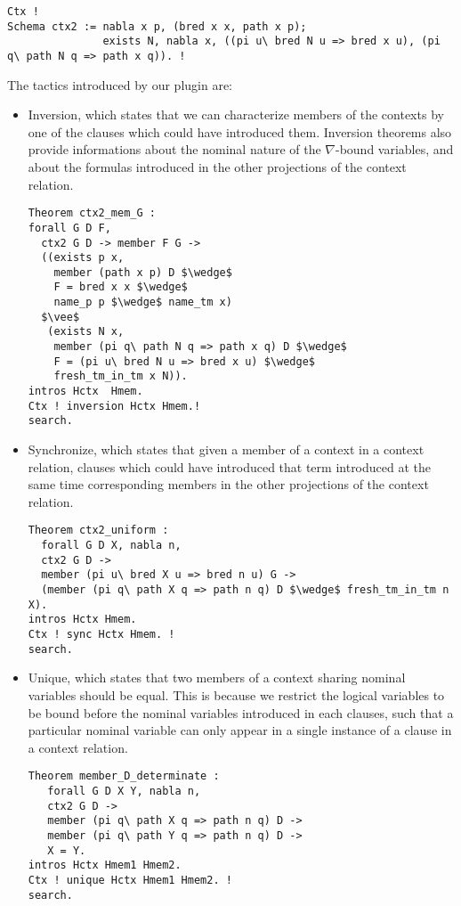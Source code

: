 \documentclass[nocopyrightspace,authoryear]{sigplanconf}
\begin{document}
\begin{lstlisting}
Ctx !
Schema ctx2 := nabla x p, (bred x x, path x p);
               exists N, nabla x, ((pi u\ bred N u => bred x u), (pi q\ path N q => path x q)). !
\end{lstlisting}


The tactics introduced by our plugin are:
\begin{itemize}
\item Inversion, which states that we can characterize members of the contexts by one of the clauses which could have introduced them. Inversion theorems also provide informations about the nominal nature of the $\nabla$-bound variables, and about the formulas introduced in the other projections of the context relation.

\begin{lstlisting}
Theorem ctx2_mem_G :
forall G D F,
  ctx2 G D -> member F G ->
  ((exists p x, 
    member (path x p) D $\wedge$
    F = bred x x $\wedge$  
    name_p p $\wedge$ name_tm x)
  $\vee$
   (exists N x, 
    member (pi q\ path N q => path x q) D $\wedge$ 
    F = (pi u\ bred N u => bred x u) $\wedge$  
    fresh_tm_in_tm x N)).
intros Hctx  Hmem. 
Ctx ! inversion Hctx Hmem.! 
search.
\end{lstlisting}

\item Synchronize, which states that given a member of a context in a context relation, clauses which could have introduced that term introduced at the same time corresponding members in the other projections of the context relation.
\begin{lstlisting}
Theorem ctx2_uniform :
  forall G D X, nabla n,
  ctx2 G D ->
  member (pi u\ bred X u => bred n u) G ->
  (member (pi q\ path X q => path n q) D $\wedge$ fresh_tm_in_tm n X).
intros Hctx Hmem. 
Ctx ! sync Hctx Hmem. ! 
search.
\end{lstlisting}

\item Unique, which states that two members of a context sharing nominal variables should be equal. This is because we restrict the logical variables to be bound before the nominal variables introduced in each clauses, such that a particular nominal variable can only appear in a single instance of a clause in a context relation.   

\begin{lstlisting}
Theorem member_D_determinate :
   forall G D X Y, nabla n,
   ctx2 G D ->
   member (pi q\ path X q => path n q) D ->
   member (pi q\ path Y q => path n q) D ->
   X = Y.
intros Hctx Hmem1 Hmem2. 
Ctx ! unique Hctx Hmem1 Hmem2. ! 
search.
\end{lstlisting}


\end{itemize}
\end{document}
